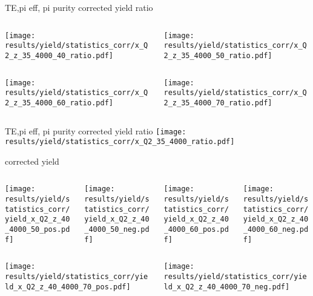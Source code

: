 \begin{frame}{TE,pi eff, pi purity corrected yield ratio}
\begin{columns}
\begin{column}[T]{0.5\textwidth}
\texttt{[image: results/yield/statistics\_corr/x\_Q2\_z\_35\_4000\_40\_ratio.pdf]}
\end{column}
\begin{column}[T]{0.5\textwidth}
\texttt{[image: results/yield/statistics\_corr/x\_Q2\_z\_35\_4000\_50\_ratio.pdf]}
\end{column}
\end{columns}
\begin{columns}
\begin{column}[T]{0.5\textwidth}
\texttt{[image: results/yield/statistics\_corr/x\_Q2\_z\_35\_4000\_60\_ratio.pdf]}
\end{column}
\begin{column}[T]{0.5\textwidth}
\texttt{[image: results/yield/statistics\_corr/x\_Q2\_z\_35\_4000\_70\_ratio.pdf]}
\end{column}
\end{columns}
\end{frame}
\begin{frame}{TE,pi eff, pi purity corrected yield ratio}
\texttt{[image: results/yield/statistics\_corr/x\_Q2\_35\_4000\_ratio.pdf]}
\end{frame}
\begin{frame}{corrected yield}
\begin{columns}
\begin{column}[T]{0.25\textwidth}
\texttt{[image: results/yield/statistics\_corr/yield\_x\_Q2\_z\_40\_4000\_50\_pos.pdf]}
\end{column}
\begin{column}[T]{0.25\textwidth}
\texttt{[image: results/yield/statistics\_corr/yield\_x\_Q2\_z\_40\_4000\_50\_neg.pdf]}
\end{column}
\begin{column}[T]{0.25\textwidth}
\texttt{[image: results/yield/statistics\_corr/yield\_x\_Q2\_z\_40\_4000\_60\_pos.pdf]}
\end{column}
\begin{column}[T]{0.25\textwidth}
\texttt{[image: results/yield/statistics\_corr/yield\_x\_Q2\_z\_40\_4000\_60\_neg.pdf]}
\end{column}
\end{columns}
\begin{columns}
\begin{column}[T]{0.25\textwidth}
\texttt{[image: results/yield/statistics\_corr/yield\_x\_Q2\_z\_40\_4000\_70\_pos.pdf]}
\end{column}
\begin{column}[T]{0.25\textwidth}
\texttt{[image: results/yield/statistics\_corr/yield\_x\_Q2\_z\_40\_4000\_70\_neg.pdf]}
\end{column}
\end{columns}
\end{frame}
